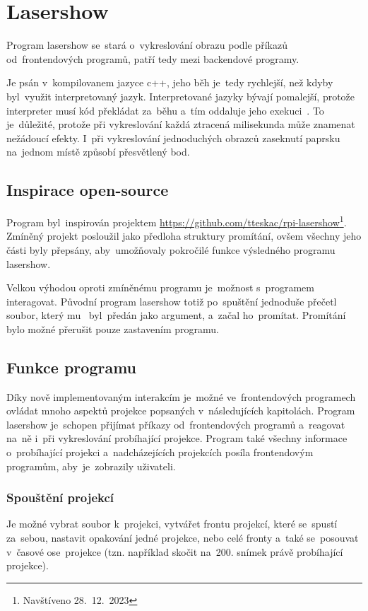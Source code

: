 \section{Lasershow}
Program lasershow se~stará  o~vykreslování obrazu podle příkazů od~frontendových programů, patří tedy mezi backendové programy.

Je psán  v~kompilovanem jazyce c++, jeho běh je~tedy rychlejší, než kdyby  byl~využit interpretovaný jazyk.
Interpretované jazyky bývají pomalejší, protože interpreter musí kód překládat za~běhu  a~tím oddaluje jeho exekuci~\cite{interpret}.
To je~důležité, protože při vykreslování každá ztracená milisekunda může znamenat nežádoucí efekty.  I~při vykreslování jednoduchých obrazců zaseknutí paprsku na~jednom místě způsobí přesvětlený bod.

\subsection{Inspirace open-source}
Program  byl~inspirován projektem \url{https://github.com/tteskac/rpi-lasershow}\footnote{Navštíveno 28.~12.~2023}. Zmíněný projekt posloužil jako předloha struktury promítání, ovšem všechny jeho části byly přepsány,  aby~umožňovaly pokročilé funkce výsledného programu lasershow.

Velkou výhodou oproti zmíněnému programu je~možnost s~programem interagovat.
Původní program lasershow totiž po~spuštění jednoduše přečetl soubor, který mu ~byl~předán jako argument,  a~začal ho~promítat. Promítání bylo možné přerušit pouze zastavením programu.

\subsection{Funkce programu}
Díky nově implementovaným interakcím je~možné ve~frontendových programech ovládat mnoho aspektů projekce popsaných  v~následujících kapitolách. Program lasershow je~schopen přijímat příkazy od~frontendových programů a~reagovat na~ně  i~při vykreslování probíhající projekce. Program také všechny informace  o~probíhající projekci  a~nadcházejících projekcích posíla frontendovým programům,  aby~je~zobrazily uživateli.

\subsubsection{Spouštění projekcí}
Je možné vybrat soubor  k~projekci, vytvářet frontu projekcí, které se~spustí za~sebou, nastavit opakování jedné projekce, nebo celé fronty  a~také se~posouvat  v~časové  ose~projekce (tzn. například skočit na~200. snímek právě probíhající projekce).

